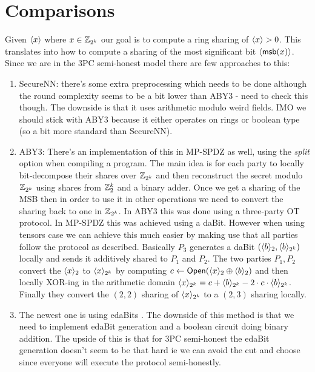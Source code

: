 \section{Comparisons}
Given $\langle {x} \rangle$ where $x \in \mathbb{Z}_{2^k}$ our goal is to compute a ring sharing of $\langle {x} \rangle > 0$.
This translates into how to compute a sharing of the most significant bit $\langle {\mathsf{msb}(x)} \rangle$.
Since we are in the 3PC semi-honest model there are few approaches to this:
\begin{enumerate}

   \item SecureNN: there's some extra preprocessing which needs to be done
   although the round complexity seems to be a bit lower than ABY3 - need to
   check this though. The downside is that it uses arithmetic modulo weird
   fields. IMO we should stick with ABY3 because it either operates on rings
   or boolean type (so a bit more standard than SecureNN).
   \item ABY3:
   There's an implementation of this in MP-SPDZ as well, using
   the \textit{split} option when compiling a program. The main idea is for
   each party to locally bit-decompose their shares over $\mathbb{Z}_{2^k}$ and then
   reconstruct the secret modulo $\mathbb{Z}_{2^k}$ using shares from $\mathbb{Z}^k_2$ and a
   binary adder. Once we get a sharing of the MSB then in order to use it in
   other operations we need to convert the sharing back to one in $\mathbb{Z}_{2^k}$.
   In ABY3 this was done using a three-party OT protocol. In MP-SPDZ this was
   achieved using a daBit.
   However when using tensors case we can achieve this much easier by making
   use that all parties follow the protocol as described.
   Basically $P_3$ generates a
   daBit $(\langle {b} \rangle_2, \langle {b} \rangle_{2^k})$ locally and sends it additively
   shared to $P_1$ and $P_2$. The two parties $P_1, P_2$ convert the
   $\langle {x} \rangle_2$ to $\langle {x} \rangle_{2^k}$ by computing $c \gets
   \mathsf{Open}(\langle {x} \rangle_2 \oplus \langle {b} \rangle_2)$ and then locally XOR-ing in
   the arithmetic domain $\langle {x} \rangle_{2^k} = c + \langle {b} \rangle_{2^k} - 2 \cdot c \cdot
   \langle {b} \rangle_{2^k}$. Finally they convert the $(2,2)$ sharing of $\langle {x} \rangle_{2^k}$ 
   to a $(2,3)$ sharing locally.
   \item The newest one is using edaBits \cite{C:EGKRS20}. The downside of
   this method is that we need to implement edaBit generation and a boolean
   circuit doing binary addition. The upside of this is that for 3PC
   semi-honest the edaBit generation doesn't seem to be that hard ie
   we can avoid the cut and choose since everyone will execute the protocol
   semi-honestly.
\end{enumerate}

